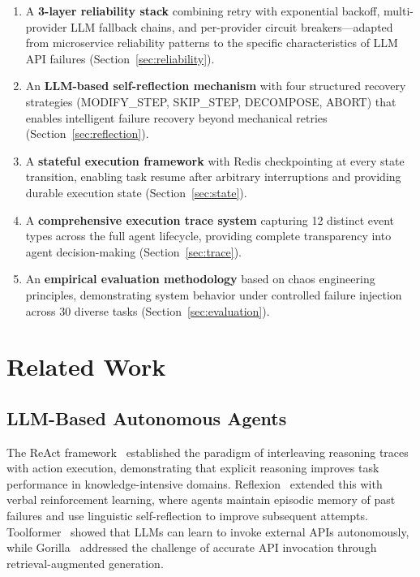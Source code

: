 \documentclass[conference]{IEEEtran}
\begin{document}
\begin{enumerate}
    \item A \textbf{3-layer reliability stack} combining retry with exponential backoff, multi-provider LLM fallback chains, and per-provider circuit breakers---adapted from microservice reliability patterns to the specific characteristics of LLM API failures (Section~\ref{sec:reliability}).
    
    \item An \textbf{LLM-based self-reflection mechanism} with four structured recovery strategies (MODIFY\_STEP, SKIP\_STEP, DECOMPOSE, ABORT) that enables intelligent failure recovery beyond mechanical retries (Section~\ref{sec:reflection}).
    
    \item A \textbf{stateful execution framework} with Redis checkpointing at every state transition, enabling task resume after arbitrary interruptions and providing durable execution state (Section~\ref{sec:state}).
    
    \item A \textbf{comprehensive execution trace system} capturing 12 distinct event types across the full agent lifecycle, providing complete transparency into agent decision-making (Section~\ref{sec:trace}).
    
    \item An \textbf{empirical evaluation methodology} based on chaos engineering principles, demonstrating system behavior under controlled failure injection across 30 diverse tasks (Section~\ref{sec:evaluation}).
\end{enumerate}

\section{Related Work}

\subsection{LLM-Based Autonomous Agents}

The ReAct framework~\cite{yao2023react} established the paradigm of interleaving reasoning traces with action execution, demonstrating that explicit reasoning improves task performance in knowledge-intensive domains. Reflexion~\cite{shinn2023reflexion} extended this with verbal reinforcement learning, where agents maintain episodic memory of past failures and use linguistic self-reflection to improve subsequent attempts. Toolformer~\cite{schick2023toolformer} showed that LLMs can learn to invoke external APIs autonomously, while Gorilla~\cite{patil2023gorilla} addressed the challenge of accurate API invocation through retrieval-augmented generation.
\end{document}
